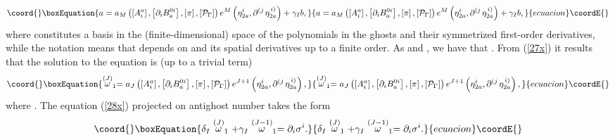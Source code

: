 \documentclass[a4paper,12pt]{article}
\begin{document}
\begin{equation}\coord{}\boxEquation{
a=a_{M}\left( \left[ A_{i}^{a}\right] ,\left[ \partial _{i}B_{a}^{0i}\right]
,\left[ \pi \right] ,\left[ \mathcal{P}_{\Gamma }\right] \right) e^{M}\left(
\eta _{2a}^{i},\partial ^{\left( j\right. }\eta _{2a}^{\left. i\right)
}\right) +\gamma _{I}b,  \label{27x}
}{
a=a_{M}\left( \left[ A_{i}^{a}\right] ,\left[ \partial _{i}B_{a}^{0i}\right]
,\left[ \pi \right] ,\left[ \mathcal{P}_{\Gamma }\right] \right) e^{M}\left(
\eta _{2a}^{i},\partial ^{\left( j\right. }\eta _{2a}^{\left. i\right)
}\right) +\gamma _{I}b,  }{ecuacion}\coordE{}\end{equation}
where \coordHE{} constitutes a basis in the
(finite-dimensional) space of the polynomials in the ghosts \coordHE{}
and their symmetrized first-order derivatives, while the notation \coordHE{} means that \coordHE{} depends on \coordHE{} and its spatial derivatives up to a
finite order. As \coordHE{} and \coordHE{}, we have that \coordHE{}. From (\ref{27x}) it results that the solution
to the equation \coordHE{} is
(up to a trivial term) 
\begin{equation}\coord{}\boxEquation{
\stackrel{\left( J\right) }{\omega }_{1}=a_{J}\left( \left[ A_{i}^{a}\right]
,\left[ \partial _{i}B_{a}^{0i}\right] ,\left[ \pi \right] ,\left[ \mathcal{P
}_{\Gamma }\right] \right) e^{J+1}\left( \eta _{2a}^{i},\partial ^{\left(
j\right. }\eta _{2a}^{\left. i\right) }\right) ,  \label{29x}
}{
\stackrel{\left( J\right) }{\omega }_{1}=a_{J}\left( \left[ A_{i}^{a}\right]
,\left[ \partial _{i}B_{a}^{0i}\right] ,\left[ \pi \right] ,\left[ \mathcal{P
}_{\Gamma }\right] \right) e^{J+1}\left( \eta _{2a}^{i},\partial ^{\left(
j\right. }\eta _{2a}^{\left. i\right) }\right) ,  }{ecuacion}\coordE{}\end{equation}
where \coordHE{}. The equation (\ref{28x})
projected on antighost number \coordHE{} takes the form 
\begin{equation}\coord{}\boxEquation{
\delta _{I}\stackrel{\left( J\right) }{\omega }_{1}+\gamma _{I}\stackrel{
\left( J-1\right) }{\omega }_{1}=\partial _{i}\sigma ^{i}.  \label{30x}
}{
\delta _{I}\stackrel{\left( J\right) }{\omega }_{1}+\gamma _{I}\stackrel{
\left( J-1\right) }{\omega }_{1}=\partial _{i}\sigma ^{i}.  }{ecuacion}\coordE{}\end{equation}
\end{document}
